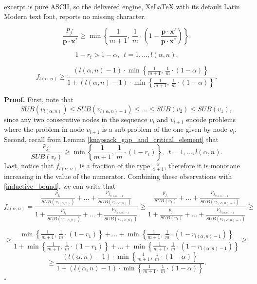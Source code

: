 \documentclass[10pt,a4paper]{amsart}
\renewenvironment{proof}[1]{\par\medskip\noindent\textbf{#1}\enspace\ignorespaces}{\par\medskip}
\newcommand{\Halmos}{\hfill$\square$}
\begin{document}
excerpt is pure ASCII, so the delivered engine, XeLaTeX with its default Latin Modern text font, reports no missing character.
\begin{lmm}\label{knapsack_gap_and_critical_element}
     \[
     \frac{p_{j^*}}{\bm{p}\cdot \bm{x}^*} \ge \min\left\{\frac{1}{m+1}, \,\frac{1}{m} \cdot \left(1-\frac{\bm{p}\cdot \bm{x}'}{\bm{p}\cdot \bm{x}^*}\right)\right\}.
    \]
\end{lmm}

    \begin{equation}\label{inductive_bound}
        1-r_t > 1- \alpha, \,\,\, t = 1, \ldots, l(\alpha, n).
    \end{equation}

    \begin{lmm}\label{f}
        \[
        f_{l(\alpha, n)} \ge \frac{(l(\alpha, n) -1)\cdot \min\left\{\frac{1}{m+1},\, \frac{1}{m} \cdot (1-\alpha)\right\}}{1+(l(\alpha, n) -1)\cdot \min\left\{\frac{1}{m+1},\, \frac{1}{m} \cdot (1-\alpha)\right\}}.
        \]
    \end{lmm}

    \begin{proof}{\textbf{Proof.}}
        First, note that
        \[
        SUB(v_{l(\alpha, n)}) \le SUB(v_{l(\alpha, n)-1}) \le \ldots \le SUB(v_2) \le SUB(v_1),
        \]
        since any two consecutive nodes in the sequence $v_i$ and $v_{i+1}$ encode problems where the problem in node $v_{i+1}$ is a sub-problem of the one given by node $v_i$. Second, recall from Lemma \ref{knapsack_gap_and_critical_element} that 
        \[
        \frac{p_{j_t}}{SUB(v_t)} \ge \min\left\{\frac{1}{m+1}, \,\frac{1}{m}\cdot (1-r_t) \right\}, \,\,\, t = 1, \ldots, l(\alpha, n).
        \]
        Last, notice that $f_{l(\alpha, n)}$ is a fraction of the type $\frac{x}{x+1}$, therefore it is monotone increasing in the value of the numerator. Combining these observations with \eqref{inductive_bound}, we can write that
        \[
        f_{l(\alpha, n)} = \frac{\frac{p_{j_1}}{SUB(v_{l(\alpha, n)})} + \ldots + \frac{p_{j_{l(\alpha, n)-1}}}{SUB(v_{l(\alpha, n)})}}
        {1 + \frac{p_{j_1}}{SUB(v_{l(\alpha, n)})} + \ldots + \frac{p_{j_{l(\alpha, n)-1}}}{SUB(v_{l(\alpha, n)})}} \ge 
        \frac{\frac{p_{j_1}}{SUB(v_1)} + \ldots + \frac{p_{j_{l(\alpha, n)-1}}}{SUB(v_{l(\alpha, n)-1})}}
        {1 + \frac{p_{j_1}}{SUB(v_1)} + \ldots + \frac{p_{j_{l(\alpha, n)-1}}}{SUB(v_{l(\alpha, n)-1})}} \ge
        \]

        \[
        \ge \frac{\min\left\{\frac{1}{m+1}, \, \frac{1}{m}\cdot (1-r_1)\right\} + \ldots + \min\left\{\frac{1}{m+1}, \, \frac{1}{m}\cdot (1-r_{l(\alpha,n)-1})\right\}}{1+\min\left\{\frac{1}{m+1}, \, \frac{1}{m}\cdot (1-r_1)\right\} + \ldots + \min\left\{\frac{1}{m+1}, \, \frac{1}{m}\cdot (1-r_{l(\alpha,n)-1})\right\}} \ge 
        \]
        \[
        \ge \frac{(l(\alpha, n) -1)\cdot \min\left\{\frac{1}{m+1},\, \frac{1}{m} \cdot (1-\alpha)\right\}}{1+(l(\alpha, n) -1)\cdot \min\left\{\frac{1}{m+1},\, \frac{1}{m} \cdot (1-\alpha)\right\}}.
        \]
        \hfill \Halmos
    \end{proof}
\end{document}
